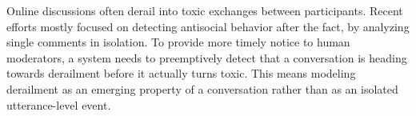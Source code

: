 Online discussions often derail into toxic exchanges between participants. Recent efforts mostly focused on detecting antisocial behavior after the fact, by analyzing single comments in isolation. To provide more timely notice to human moderators, a system needs to preemptively detect that a conversation is heading towards derailment before it actually turns toxic. This means modeling derailment as an emerging property of a conversation rather than as an isolated utterance-level event.